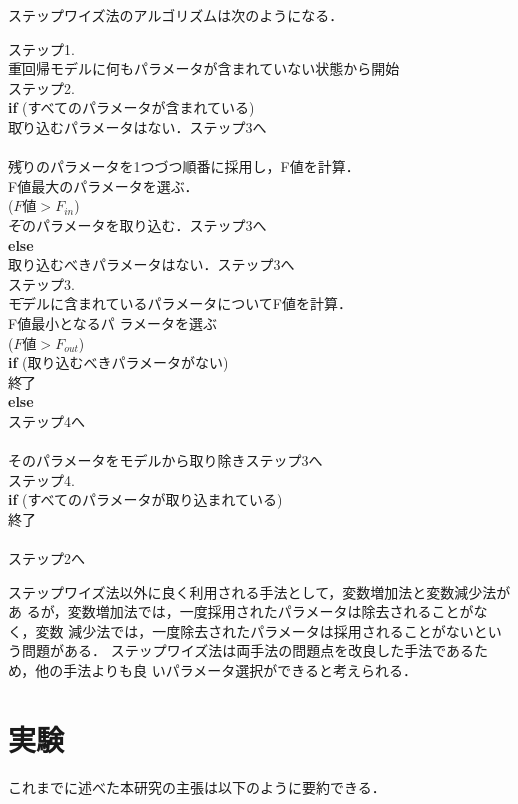 ステップワイズ法のアルゴリズムは次のようになる．

\begin{tabbing}
ステップ1. \\
\quad \= 重回帰モデルに何もパラメータが含まれていない状態から開始\\
ステップ2. \\
\quad \= {\bf if} (すべてのパラメータが含まれている)\\
\>\quad \= 取り込むパラメータはない．ステップ3へ \\
 \\
\>\quad \= 残りのパラメータを1つづつ順番に採用し，F値を計算．\\
\>\> F値最大のパラメータを選ぶ．\\
\> ($F値>F_{in}$) \\
\> \> \quad \= そのパラメータを取り込む．ステップ3へ\\
\> \> {\bf else}\\
\> \> \> 取り込むべきパラメータはない．ステップ3へ\\
ステップ3. \\
\quad \= モデルに含まれているパラメータについてF値を計算．\\
\> F値最小となるパ
ラメータを選ぶ\\
 ($F値>F_{out}$)\\
\> \quad \={\bf if} (取り込むべきパラメータがない)\\
\> \> \quad \= 終了\\
\> \> {\bf else}\\
\> \> \> ステップ4へ\\
\\
\> \> そのパラメータをモデルから取り除きステップ3へ\\
ステップ4. \\
\quad \= {\bf if} (すべてのパラメータが取り込まれている)\\
\>\>終了\\
\\
\>\>ステップ2へ\\
\end{tabbing}
ステップワイズ法以外に良く利用される手法として，変数増加法と変数減少法があ
るが，変数増加法では，一度採用されたパラメータは除去されることがなく，変数
減少法では，一度除去されたパラメータは採用されることがないという問題がある．
ステップワイズ法は両手法の問題点を改良した手法であるため，他の手法よりも良
いパラメータ選択ができると考えられる．

\section{実験}\label{sec:experiments}
これまでに述べた本研究の主張は以下のように要約できる．

